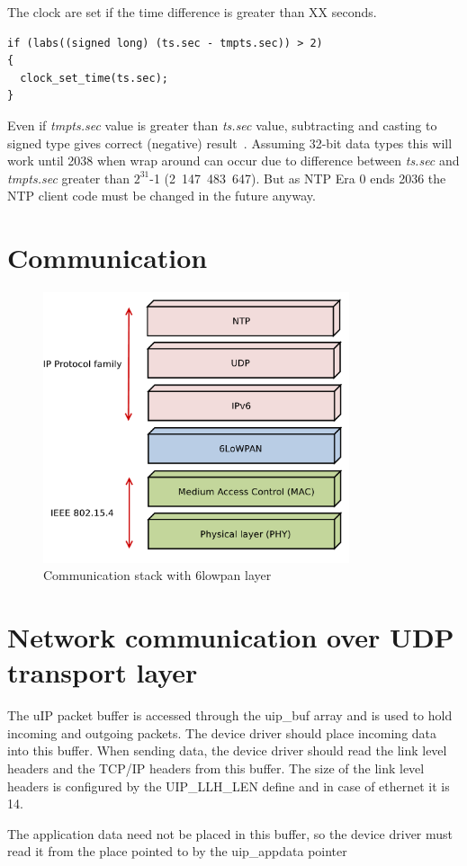 The clock are set if the time difference is greater than XX seconds. %
\begin{lstlisting}
if (labs((signed long) (ts.sec - tmpts.sec)) > 2)
{
  clock_set_time(ts.sec);
}
\end{lstlisting}
Even if {\it{tmpts.sec}} value is greater than {\it{ts.sec}} value,
subtracting and casting to signed type gives correct (negative) result~\cite{c99}.
Assuming 32-bit data types this will work until 2038 when wrap around can occur due to difference
between {\it{ts.sec}} and {\it{tmpts.sec}} greater than $2^{31}$-1 (2~147~483~647).
But as NTP Era 0 ends 2036 the NTP client code must be changed in the future anyway.


\section{Communication}
\begin{figure}
  \centering
  \includegraphics[width=9cm,keepaspectratio]{fig/6lowpan.pdf}
  \caption{Communication stack with 6lowpan layer}
  \label{fig:implementation-6lowpan}
  \bigskip
\end{figure}



\section{Network communication over UDP transport layer}
The uIP packet buffer is accessed through
the uip\_buf array and is used to hold incoming and outgoing packets.
The device driver should place incoming data into this buffer.
When sending data, the device driver should read the link
level headers and the TCP/IP headers from this buffer.
The size of the link level headers is configured by the UIP\_LLH\_LEN
define and in case of ethernet it is 14.

The application data need not be placed in this buffer, so
the device driver must read it from the place pointed to by the
uip\_appdata pointer %
